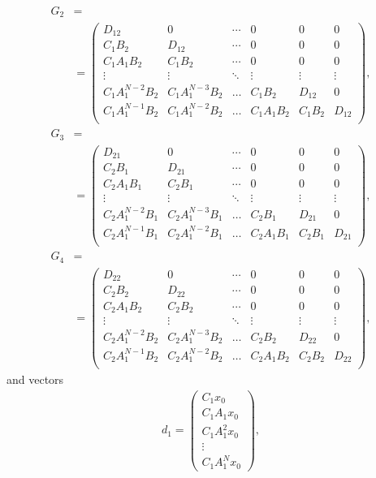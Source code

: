 \begin{align}G_2 & = \nonumber\\
&= \begin{pmatrix}
D_{12} & 0 & \cdots & 0 & 0 & 0 \\
C_1B_2 & D_{12} & \cdots & 0 & 0 & 0\\
C_1A_1B_2 & C_1B_2 & \cdots & 0 & 0 & 0\\
\vdots & \vdots & \ddots & \vdots  & \vdots & \vdots \\
C_1A_1^{N-2} B_2 & C_1A_1^{N-3} B_2 &\dots &C_1B_2 & D_{12}& 0\\
C_1A_1^{N-1} B_2 & C_1A_1^{N-2} B_2 &\dots &C_1A_1B_2 & C_1B_2& D_{12}\\
\end{pmatrix},
\end{align}
\begin{align}
G_3 & = \nonumber\\
&= \begin{pmatrix}
D_{21} & 0 & \cdots & 0 & 0 & 0 \\
C_2B_1 & D_{21} & \cdots & 0 & 0 & 0\\
C_2A_1B_1 & C_2B_1 & \cdots & 0 & 0 & 0\\
\vdots & \vdots & \ddots & \vdots  & \vdots & \vdots \\
C_2A_1^{N-2} B_1 & C_2A_1^{N-3} B_1 &\dots &C_2B_1 & D_{21}& 0\\
C_2A_1^{N-1} B_1 & C_2A_1^{N-2} B_1 &\dots &C_2A_1B_1 & C_2B_1& D_{21}\\
\end{pmatrix},
\end{align}
\begin{align}
G_4 & = \nonumber\\
&= \begin{pmatrix}
D_{22} & 0 & \cdots & 0 & 0 & 0 \\
C_2B_2 & D_{22} & \cdots & 0 & 0 & 0\\
C_2A_1B_2 & C_2B_2 & \cdots & 0 & 0 & 0\\
\vdots & \vdots & \ddots & \vdots  & \vdots & \vdots \\
C_2A_1^{N-2} B_2 & C_2A_1^{N-3} B_2 &\dots &C_2B_2 & D_{22}& 0\\
C_2A_1^{N-1} B_2 & C_2A_1^{N-2} B_2 &\dots &C_2A_1B_2 & C_2B_2& D_{22}\\
\end{pmatrix},
\end{align}
and vectors 
\begin{align}
d_1 = \begin{pmatrix}
C_1 x_0 \\ C_1A_1 x_0 \\ C_1A_1^2 x_0 \\ \vdots \\ C_1A_1^Nx_0
\end{pmatrix},
\end{align}
